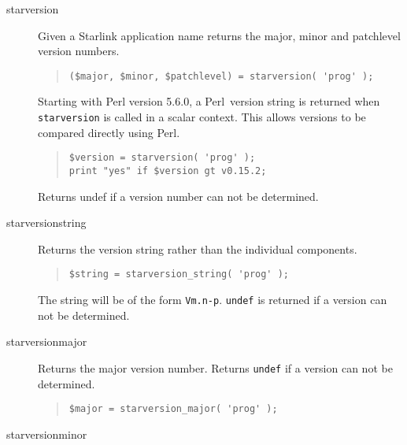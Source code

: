 \documentclass[twoside,11pt]{article}
\newenvironment{myquote}{\begin{quote}\begin{small}}{\end{small}\end{quote}}
\newcommand{\perl}{\xref{\textsf{Perl}}{sun193}{}}
\newcommand{\xref}[3]{#1}
\renewcommand{\_}{\texttt{\symbol{95}}}
\begin{document}
\begin{description}

\item[starversion] \mbox{}

Given a Starlink application name returns the major, minor and
patchlevel version numbers.

\begin{myquote}
\begin{verbatim}
($major, $minor, $patchlevel) = starversion( 'prog' );
\end{verbatim}
\end{myquote} %


Starting with Perl version 5.6.0, a \perl\ version string is returned
when \texttt{starversion} is called in a scalar context. This allows 
versions to be compared directly using Perl.

\begin{myquote}
\begin{verbatim}
$version = starversion( 'prog' );
print "yes" if $version gt v0.15.2;
\end{verbatim}
\end{myquote}

Returns undef if a version number can not be determined.

\item[starversion\_string] \mbox{}

Returns the version string rather than the individual components.

\begin{myquote}
\begin{verbatim}
$string = starversion_string( 'prog' );
\end{verbatim}
\end{myquote} %

The string will be of the form \texttt{Vm.n-p}. \texttt{undef} is returned
if a version can not be determined.

\item[starversion\_major] \mbox{}

Returns the major version number. Returns \texttt{undef} if a version
can not be determined.

\begin{myquote}
\begin{verbatim}
$major = starversion_major( 'prog' );
\end{verbatim} 
\end{myquote} %

\item[starversion\_minor] \mbox{}


\end{description}
\end{document}
